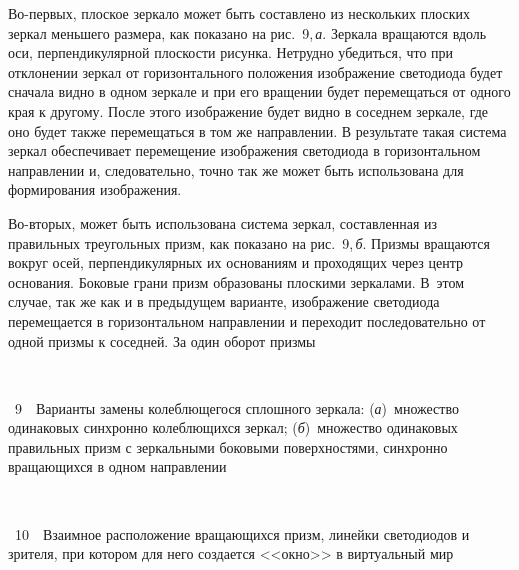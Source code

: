 \begin{multicols}{2}
  
  Во-первых, плоское зеркало может быть со\-став\-ле\-но из нескольких плоских зеркал 
меньшего размера, как показано на рис.~9,\,\textit{а}. Зеркала вращаются  вдоль оси, 
перпендикулярной плоскости рисунка. Нетрудно убедиться, что при отклонении зеркал от 
горизонтального положения изображение светодиода будет сначала видно в одном 
зеркале и при его вращении будет перемещаться от одного края к другому. После этого 
изображение будет видно в соседнем зеркале, где оно будет также перемещаться в том же 
направлении. В результате такая система
зеркал обеспечивает перемещение изображения 
светодиода в горизонтальном направлении и, следовательно, точно так же может быть 
использована для формирования изображения. 

  
  Во-вторых, может быть использована система зеркал, составленная из правильных 
треугольных призм, как показано на рис.~9,\,\textit{б}. Призмы вращаются вокруг 
осей, перпендикулярных их основаниям и проходящих через центр основания. Боковые 
грани призм образованы плоскими зеркалами. В~этом случае, так же как и в предыдущем 
варианте, изоб\-ра\-жение светодиода перемещается в горизонтальном направлении и 
переходит последовательно от одной призмы к соседней. За один оборот призмы\linebreak 

\begin{center}
\vspace*{-2pt}
\mbox{%
\epsfxsize=73.764mm
}
\end{center}
\vspace*{-3pt}
{{\figurename~9}\ \ \small{Варианты замены колеблющегося сплошного зеркала: (\textit{а})~множество одинаковых 
синхронно колеблющихся зеркал; (\textit{б})~множество одинаковых правильных призм с зеркальными 
боковыми поверхностями, синхронно вращающихся в одном направлении}}



\addtocounter{figure}{1}  

\begin{center}
\vspace*{3pt}
\mbox{%
\epsfxsize=64.42mm
}
\end{center}
{{\figurename~10}\ \ \small{Взаимное расположение вращающихся призм, линейки светодиодов и зрителя, при котором для 
него создается <<окно>> в виртуальный мир}}


\end{multicols}
